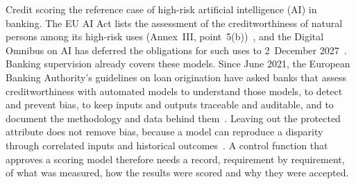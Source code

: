 
%
Credit scoring  the reference case of high-risk artificial intelligence (AI) in banking.
The EU AI Act lists the assessment of the creditworthiness of natural persons among its high-risk uses (Annex~III, point~5(b))~\cite{euaiact2024}, and the Digital Omnibus on AI has deferred the obligations for such uses to 2~December 2027~\cite{euomnibus2026ai}.
Banking supervision already covers these models.
Since June 2021, the European Banking Authority's guidelines on loan origination have asked banks that assess creditworthiness with automated models to understand those models, to detect and prevent bias, to keep inputs and outputs traceable and auditable, and to document the methodology and data behind them~\cite{eba2020loan}.
Leaving out the protected attribute does not remove bias, because a model can reproduce a disparity through correlated inputs and historical outcomes~\cite{barocas2016big}.
A control function that approves a scoring model therefore needs a record, requirement by requirement, of what was measured, how the results were scored and why they were accepted.

